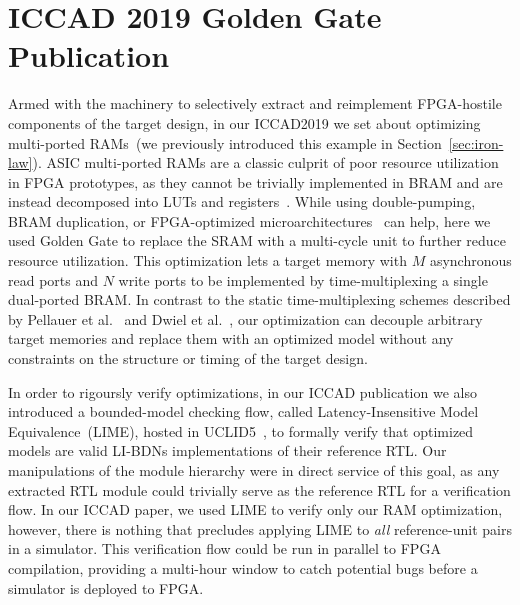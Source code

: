 \section{ICCAD 2019 Golden Gate Publication}

Armed with the machinery to selectively extract and reimplement FPGA-hostile
components of the target design, in our ICCAD2019 we set about optimizing
multi-ported RAMs~(we previously introduced this example in
Section~\ref{sec:iron-law}).  ASIC multi-ported RAMs are a classic culprit of
poor resource utilization in FPGA prototypes, as they cannot be trivially
implemented in BRAM and are instead decomposed into LUTs and
registers~\cite{FPGAGap2}.  While using double-pumping, BRAM duplication, or
FPGA-optimized microarchitectures~\cite{MultiportXOR} can help, here we used Golden Gate to
replace the SRAM with a multi-cycle unit to further reduce resource
utilization. This optimization lets a target memory with $M$ asynchronous read ports and
$N$ write ports to be implemented by time-multiplexing
a single dual-ported BRAM. In contrast to the static time-multiplexing schemes described
by Pellauer et al.~\cite{APortNetworks} and Dwiel et al.~\cite{fabscalarfpga}, our optimization can decouple arbitrary target
memories and replace them with an optimized model without any constraints on the structure or timing of the
target design.

In order to rigoursly verify optimizations, in our ICCAD publication we also
introduced a bounded-model checking flow, called Latency-Insensitive Model
Equivalence~(LIME), hosted in UCLID5~\cite{UCLID5}, to formally verify that
optimized models are valid LI-BDNs implementations of their reference RTL.  Our
manipulations of the module hierarchy were in direct service of this goal, as
any extracted RTL module could trivially serve as the reference RTL for a
verification flow. In our ICCAD paper, we used LIME to verify only our RAM
optimization, however, there is nothing that precludes applying LIME to
\emph{all} reference-unit pairs in a simulator. This verification flow could be
run in parallel to FPGA compilation, providing a multi-hour window to catch
potential bugs before a simulator is deployed to FPGA.

